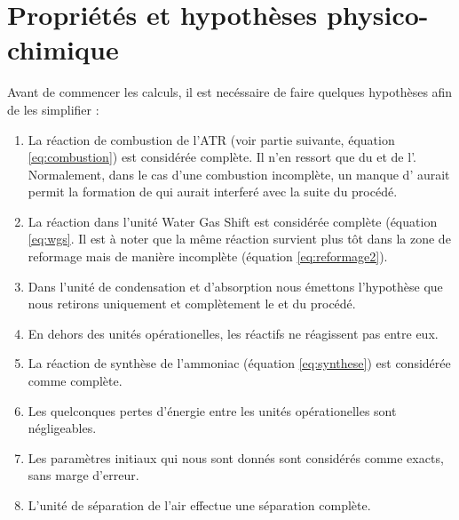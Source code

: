 \documentclass[french, a4paper, 10pt]{article}
\begin{document}
\section{Propriétés et hypothèses physico-chimique}
Avant de commencer les calculs, il est necéssaire de faire quelques hypothèses afin de les simplifier : 
\begin{enumerate}
	\item La réaction de combustion de l'ATR (voir partie suivante, équation \ref{eq:combustion}) est considérée complète. Il n'en ressort que du  et de l'. Normalement, dans le cas d'une combustion incomplète, un manque d' aurait permit la formation de  qui aurait interferé avec la suite du procédé.
	\item La réaction dans l'unité Water Gas Shift est considérée complète (équation \ref{eq:wgs}. Il est à noter que la même réaction survient plus tôt dans la zone de reformage mais de manière incomplète (équation \ref{eq:reformage2}). 
	\item Dans l'unité de condensation et d'absorption nous émettons l'hypothèse que nous retirons uniquement et complètement le  et  du procédé.
	\item En dehors des unités opérationelles, les réactifs ne réagissent pas entre eux.
	\item La réaction de synthèse de l'ammoniac (équation \ref{eq:synthese}) est considérée comme complète.
	\item Les quelconques pertes d'énergie entre les unités opérationelles sont négligeables. 
	\item Les paramètres initiaux qui nous sont donnés sont considérés comme exacts, sans marge d'erreur.
	\item L'unité de séparation de l'air effectue une séparation complète.
\end{enumerate}
\end{document}
